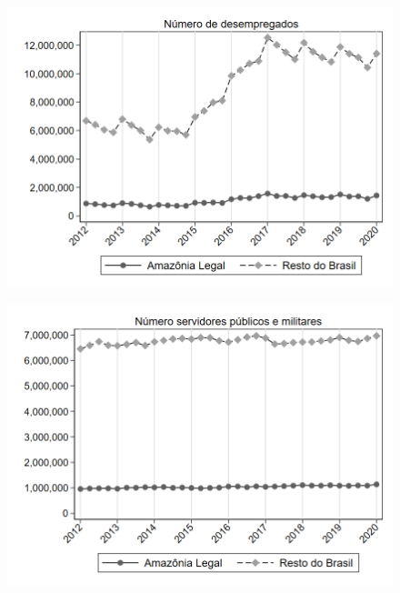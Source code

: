 \begin{frame}[label=_estrutura_emprego_n_de_desemprego]{}
\textit{\hyperlink{_estrutura_emprego}{}}
\begin{figure}
  \centering
  \includegraphics[width=1.0\linewidth]{../../analysis/output/estrutura_emprego/_estrutura_emprego_n_de_desemprego.png}
  \caption{}
  \label{fig:_estrutura_emprego_n_de_desemprego}
\end{figure}
\end{frame}

\begin{frame}[label=_estrutura_emprego_n_militar]{}
\textit{\hyperlink{_estrutura_emprego}{}}
\begin{figure}
  \centering
  \includegraphics[width=1.0\linewidth]{../../analysis/output/estrutura_emprego/_estrutura_emprego_n_militar.png}
  \caption{}
  \label{fig:_estrutura_emprego_n_militar}
\end{figure}
\end{frame}


